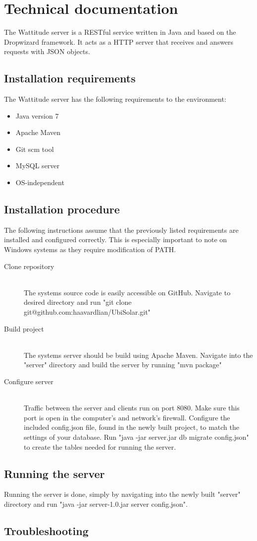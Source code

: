 \chapter{Technical documentation}
The Wattitude server is a RESTful service written in Java and based on the Dropwizard framework. It acts as a HTTP server that receives and answers requests with JSON objects. 
\section{Installation requirements}
The Wattitude server has the following requirements to the environment:
\begin{itemize}
\item Java version 7
\item Apache Maven 
\item Git scm tool
\item MySQL server
\item OS-independent
\end{itemize}
\section{Installation procedure}
The following instructions assume that the previously listed requirements are installed and configured correctly. This is especially important to note on Windows systems as they require modification of PATH.
\begin{description}
  \item[Clone repository] \hfill \\
  The systems source code is easily accessible on GitHub. Navigate to desired directory and run "git clone git@github.com:haavardlian/UbiSolar.git"
  \item[Build project] \hfill \\
  The systems server should be build using Apache Maven. Navigate into the "server" directory and build the server by running "mvn package"
  \item[Configure server] \hfill \\
  Traffic between the server and clients run on port 8080. Make sure this port is open in the computer's and network's firewall. Configure the included config.json file, found in the newly built project, to match the settings of your database. Run "java -jar server.jar db migrate config.json" to create the tables needed for running the server. 
  
\end{description}

\section{Running the server}
Running the server is done, simply by navigating into the newly built "server" directory and run "java -jar server-1.0.jar server config.json".

\section{Troubleshooting}